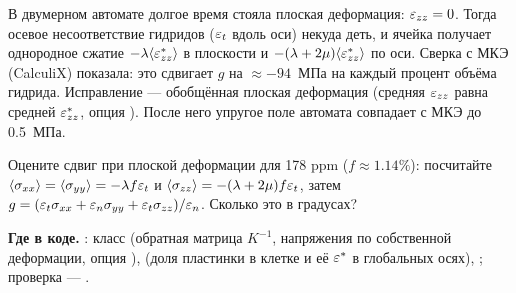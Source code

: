 \begin{warnbox}
В двумерном автомате долгое время стояла плоская деформация: $\varepsilon_{zz}=0$. Тогда осевое
несоответствие гидридов ($\varepsilon_t$ вдоль оси) некуда деть, и ячейка получает однородное сжатие
$-\lambda\langle\varepsilon^*_{zz}\rangle$ в плоскости и $-(\lambda+2\mu)\langle\varepsilon^*_{zz}\rangle$ по
оси. Сверка с МКЭ (CalculiX) показала: это сдвигает $g$ на $\approx-94$~МПа на каждый процент
объёма гидрида. Исправление --- обобщённая плоская деформация (средняя $\varepsilon_{zz}$ равна средней
$\varepsilon^*_{zz}$, опция ). После него упругое поле автомата совпадает с МКЭ до 0.5~МПа.
\end{warnbox}

\begin{exercise}
Оцените сдвиг при плоской деформации для 178 ppm ($f\approx1.14\%$): посчитайте
$\langle\sigma_{xx}\rangle=\langle\sigma_{yy}\rangle=-\lambda f\varepsilon_t$ и
$\langle\sigma_{zz}\rangle=-(\lambda+2\mu)f\varepsilon_t$, затем
$g=(\varepsilon_t\sigma_{xx}+\varepsilon_n\sigma_{yy}+\varepsilon_t\sigma_{zz})/\varepsilon_n$. Сколько это в градусах?
\end{exercise}

\begin{codebox}
\textbf{Где в коде.} : класс  (обратная матрица $K^{-1}$,
напряжения по собственной деформации, опция ),  (доля пластинки
в клетке и её $\varepsilon^*$ в глобальных осях), ; проверка ---
.
\end{codebox}

